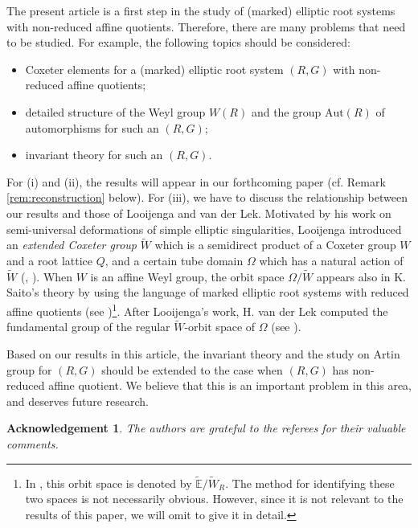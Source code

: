 \documentclass[11pt]{amsart}
\newtheorem{ack}{Acknowledgement}
\begin{document}
{
The present article is a first step in the study of (marked) elliptic root systems with 
non-reduced affine quotients. Therefore, there are many problems that need to be 
studied. For example, the following topics should be considered:
\begin{itemize}
\item[(i)] Coxeter elements for a (marked) elliptic root system $(R,G)$ with 
non-reduced affine quotients;
\item[(ii)] detailed structure of the Weyl group $W(R)$ and the group $\mathrm{Aut}(R)$
of automorphisms for such an $(R,G)$;
\item[(iii)] invariant theory for such an $(R,G)$. 
\end{itemize} 
For (i) and (ii), the results will appear in our forthcoming paper (cf. Remark 
\ref{rem:reconstruction} below).  For (iii), we have to discuss the relationship between 
our results and those of Looijenga
and van der Lek.  
Motivated by his work on semi-universal deformations of simple
elliptic singularities, Looijenga introduced an {\it extended Coxeter group}
$\widetilde{W}$ which is a semidirect product of a Coxeter group $W$ and 
a root lattice $Q$, and a certain tube domain $\Omega$ which has a natural action of 
$\widetilde{W}$ (\cite{Looijenga1976}, \cite{Looijenga1980}). 
When $W$ is an affine Weyl group, the orbit space $\Omega/\widetilde{W}$
appears also in K. Saito's theory by using the language of marked elliptic root 
systems with reduced affine quotients (see \cite{Saito1990})\footnote{In \cite{Saito1990}, 
this orbit space is denoted by $\widetilde{\mathbb{E}}/\widetilde{W}_R$. 
The method for identifying these two spaces is not 
necessarily obvious. However, since it is not relevant to the results of this paper, 
we will omit to give it in detail.}. After Looijenga's work, H. van der Lek 
computed the fundamental group of the regular $\widetilde{W}$-orbit space of 
$\Omega$ (see \cite{Lek1983}).  

Based on our results in this article, the invariant theory and the study on Artin group for 
$(R,G)$ should be extended to the case when $(R,G)$ has non-reduced affine 
quotient. We believe that this is an important problem in this area, and deserves 
future research. 


\begin{ack}
{\rm The authors are grateful to the referees for their valuable comments. }
\end{ack}










}
 
\end{document}
